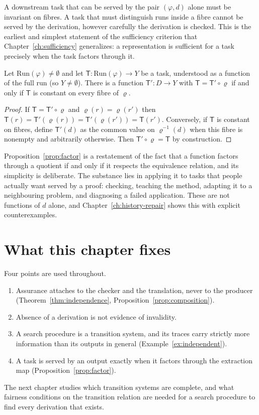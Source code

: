 A downstream task that can be served by the pair $(\varphi,d)$ alone must be invariant on fibres. A task that must distinguish runs inside a fibre cannot be served by the derivation, however carefully the derivation is checked. This is the earliest and simplest statement of the sufficiency criterion that Chapter~\ref{ch:sufficiency} generalizes: a representation is sufficient for a task precisely when the task factors through it.

\begin{proposition}
\label{prop:factor}
Let $\mathrm{Run}(\varphi)\ne\emptyset$ and let $\mathsf{T}:\mathrm{Run}(\varphi)\to Y$ be a task, understood as a function of the full run (so $Y\ne\emptyset$). There is a function $\mathsf{T}':D\to Y$ with $\mathsf{T}=\mathsf{T}'\circ\varrho$ if and only if $\mathsf{T}$ is constant on every fibre of $\varrho$.
\end{proposition}

\begin{proof}
If $\mathsf{T}=\mathsf{T}'\circ\varrho$ and $\varrho(r)=\varrho(r')$ then $\mathsf{T}(r)=\mathsf{T}'(\varrho(r))=\mathsf{T}'(\varrho(r'))=\mathsf{T}(r')$. Conversely, if $\mathsf{T}$ is constant on fibres, define $\mathsf{T}'(d)$ as the common value on $\varrho^{-1}(d)$ when this fibre is nonempty and arbitrarily otherwise. Then $\mathsf{T}'\circ\varrho=\mathsf{T}$ by construction.
\end{proof}

Proposition~\ref{prop:factor} is a restatement of the fact that a function factors through a quotient if and only if it respects the equivalence relation, and its simplicity is deliberate. The substance lies in applying it to tasks that people actually want served by a proof: checking, teaching the method, adapting it to a neighbouring problem, and diagnosing a failed application. These are not functions of $d$ alone, and Chapter~\ref{ch:history-repair} shows this with explicit counterexamples.

\section{What this chapter fixes}

Four points are used throughout.
\begin{enumerate}[nosep]
\item Assurance attaches to the checker and the translation, never to the producer (Theorem~\ref{thm:independence}, Proposition~\ref{prop:composition}).
\item Absence of a derivation is not evidence of invalidity.
\item A search procedure is a transition system, and its traces carry strictly more information than its outputs in general (Example~\ref{ex:independent}).
\item A task is served by an output exactly when it factors through the extraction map (Proposition~\ref{prop:factor}).
\end{enumerate}
The next chapter studies which transition systems are complete, and what fairness conditions on the transition relation are needed for a search procedure to find every derivation that exists.

